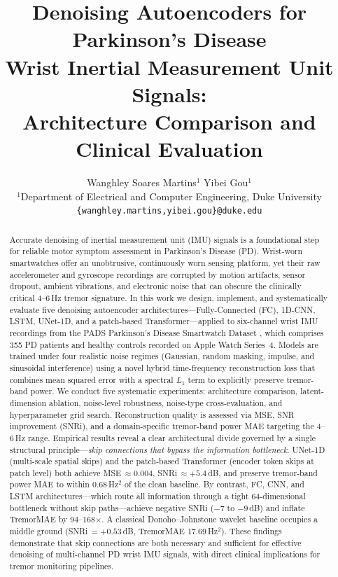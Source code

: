 \documentclass{article}
\title{Denoising Autoencoders for Parkinson's Disease\\
Wrist Inertial Measurement Unit Signals:\\
Architecture Comparison and Clinical Evaluation}
\author{%
  Wanghley Soares Martins$^{1}$ \And Yibei Gou$^{1}$ \\
  $^{1}$Department of Electrical and Computer Engineering, Duke University \\
  \texttt{\{wanghley.martins,\;yibei.gou\}@duke.edu}
}
\begin{document}
\maketitle

\begin{abstract}
Accurate denoising of inertial measurement unit (IMU) signals is a
foundational step for reliable motor symptom assessment in Parkinson's Disease
(PD).
Wrist-worn smartwatches offer an unobtrusive, continuously worn sensing
platform, yet their raw accelerometer and gyroscope recordings are corrupted by
motion artifacts, sensor dropout, ambient vibrations, and electronic noise that
can obscure the clinically critical 4--6\,Hz tremor signature.
In this work we design, implement, and systematically evaluate five denoising
autoencoder architectures---Fully-Connected (FC), 1D-CNN, LSTM, UNet-1D, and a
patch-based Transformer---applied to six-channel wrist IMU recordings from the
PADS Parkinson's Disease Smartwatch Dataset \citep{varghese2023pads}, which
comprises 355 PD patients and healthy controls recorded on Apple Watch Series~4.
Models are trained under four realistic noise regimes (Gaussian, random masking,
impulse, and sinusoidal interference) using a novel hybrid time-frequency
reconstruction loss that combines mean squared error with a spectral $L_1$ term
to explicitly preserve tremor-band power.
We conduct five systematic experiments: architecture comparison, latent-dimension
ablation, noise-level robustness, noise-type cross-evaluation, and
hyperparameter grid search.
Reconstruction quality is assessed via MSE, SNR improvement (SNRi), and a
domain-specific tremor-band power MAE targeting the 4--6\,Hz range.
Empirical results reveal a clear architectural divide governed by a single
structural principle---\emph{skip connections that bypass the information
bottleneck}.
UNet-1D (multi-scale spatial skips) and the patch-based Transformer
(encoder token skips at patch level) both achieve
MSE\,$\approx 0.004$, SNRi\,$\approx +5.4$\,dB, and preserve tremor-band
power MAE to within 0.68\,Hz$^2$ of the clean baseline.
By contrast, FC, CNN, and LSTM architectures---which route all information
through a tight 64-dimensional bottleneck without skip paths---achieve
negative SNRi ($-7$ to $-9$\,dB) and inflate TremorMAE by 94--168$\times$.
A classical Donoho--Johnstone wavelet baseline occupies a middle ground
(SNRi\,$= +0.53$\,dB, TremorMAE 17.69\,Hz$^2$).
These findings demonstrate that skip connections are both necessary and
sufficient for effective denoising of multi-channel PD wrist IMU signals,
with direct clinical implications for tremor monitoring pipelines.
\end{abstract}
\end{document}
